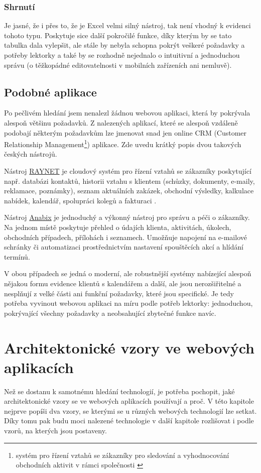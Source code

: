         \subsection{Shrnutí}
        Je jasné, že i přes to, že je Excel velmi silný nástroj, tak není vhodný k evidenci tohoto typu. Poskytuje sice další pokročilé funkce, díky kterým by se tato tabulka dala vylepšit, ale stále by nebyla schopna pokrýt veškeré požadavky a potřeby lektorky a také by se rozhodně nejednalo o intuitivní a jednoduchou správu (o těžkopádné editovatelnosti v mobilních zařízeních ani nemluvě).
    
    \section{Podobné aplikace}
    Po pečlivém hledání jsem nenalezl žádnou webovou aplikaci, která by pokrývala alespoň většinu požadavků. Z nalezených aplikací, které se alespoň vzdáleně podobají některým požadavkům lze jmenovat snad jen online CRM (Customer Relationship Management\footnote{systém pro řízení vztahů se zákazníky pro sledování a vyhodnocování obchodních aktivit v rámci společnosti \cite{crm}}) aplikace. Zde uvedu krátký popis dvou takových českých nástrojů.
    
    Nástroj \href{https://raynet.cz/}{RAYNET} je cloudový systém pro řízení vztahů se zákazníky poskytující např. databázi kontaktů, historii vztahu s klientem (schůzky, dokumenty, e-maily, reklamace, poznámky), seznam aktuálních zakázek, obchodní výsledky, kalkulace nabídek, kalendář, spolupráci kolegů a fakturaci \cite{raynet}.
    
    Nástroj \href{https://www.anabix.cz/}{Anabix} je jednoduchý a výkonný nástroj pro správu a péči o zákazníky. Na jednom místě poskytuje přehled o údajích klienta, aktivitách, úkolech, obchodních případech, přílohách i seznamech. Umožňuje napojení na e-mailové schránky či automatizaci prostřednictvím nastavení spouštěcích akcí a hlídání termínů. \cite{anabix}
    
    V obou případech se jedná o moderní, ale robustnější systémy nabízející alespoň nějakou formu evidence klientů s kalendářem a další, ale jsou nerozšiřitelné a nesplňují z velké části ani funkční požadavky, které jsou specifické. Je tedy potřeba vyvinout webovou aplikaci na míru podle potřeb lektorky: jednoduchou, pokrývající všechny požadavky a neobsahující zbytečné funkce navíc.

\chapter{Architektonické vzory ve webových aplikacích}
Než se dostanu k samotnému hledání technologií, je potřeba pochopit, jaké architektonické vzory se ve webových aplikacích používají a proč. V této kapitole nejprve popíši dva vzory, se kterými se u různých webových technologií lze setkat. Díky tomu pak budu moci nalezené technologie v další kapitole rozlišovat i podle vzorů, na kterých jsou postaveny.

